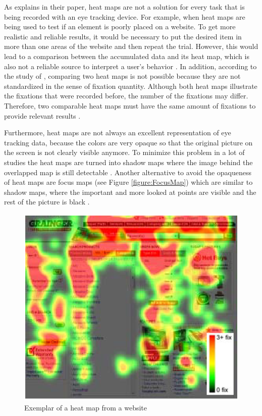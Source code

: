 As \textcite[]{bojko2009informative} explains in their paper, heat maps are not a solution for every task that is being recorded with an eye tracking device. 
For example, when heat maps are being used to test if an element is poorly placed on a website. To get more realistic and reliable results, it would be necessary to put the desired item in more than one areas of the website and then repeat the trial. However, this would lead to a comparison between the accumulated data and its heat map, which is also not a reliable source to interpret a user's behavior \autocite[]{bojko2009informative}. 
In addition, according to the study of \textcite[]{djamasbi2010efficiency}, comparing two heat maps is not possible because they are not standardized in the sense of fixation quantity. Although both heat maps illustrate the fixations that were recorded before, the number of the fixations may differ. Therefore, two comparable heat maps must have the same amount of fixations to provide relevant results \autocite[]{djamasbi2010efficiency}. 

Furthermore, heat maps are not always an excellent representation of eye tracking data, because the colors are very opaque so that the original picture on the screen is not clearly visible anymore. To minimize this problem in a lot of studies the heat maps are turned into shadow maps where the image behind the overlapped map is still detectable \autocite[]{vspakov2007visualization}. Another alternative to avoid the opaqueness of heat maps are focus maps (see Figure \ref{figure:FocusMap}) which are similar to shadow maps, where the important and more looked at points are visible and the rest of the picture is black \autocite{kruger2014subtitles}.

\begin{figure}[!ht]
    \centering
    \includegraphics[width=0.75\linewidth]{images/HeatMap_bojko2009informative.png}
    \caption{
       Exemplar of a heat map from a website \autocite[32]{bojko2009informative}
    }
    \label{figure:HeatMap}
\end{figure}

